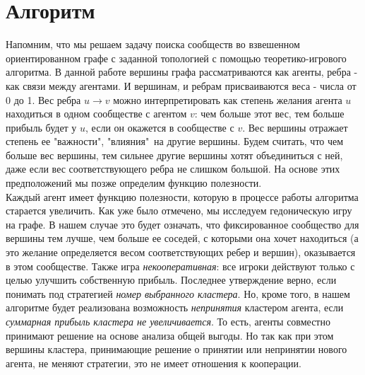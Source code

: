 \chapter{Алгоритм}
Напомним, что мы решаем задачу поиска сообществ во взвешенном ориентированном графе с заданной топологией с помощью теоретико-игрового алгоритма. В данной работе вершины графа рассматриваются как агенты, ребра - как связи между агентами. И вершинам, и ребрам присваиваются веса - числа от 0 до 1. Вес ребра $u\rightarrow v$ можно интерпретировать как степень желания агента $u$ находиться в одном сообществе с агентом $v$: чем больше этот вес, тем больше прибыль будет у $u$, если он окажется в сообществе с $v$. Вес вершины отражает степень ее "важности", "влияния"\ на другие вершины. Будем считать, что чем больше вес вершины, тем сильнее другие вершины хотят объединиться с ней, даже если вес соответствующего ребра не слишком большой. На основе этих предположений мы позже определим функцию полезности.\\

Каждый агент имеет функцию полезности, которую в процессе работы алгоритма старается увеличить. Как уже было отмечено, мы исследуем гедоническую игру на графе. В нашем случае это будет означать, что фиксированное сообщество для вершины тем лучше, чем больше ее соседей, с которыми она хочет находиться (а это желание определяется весом соответствующих ребер и вершин), оказывается в этом сообществе. Также игра \textit{некооперативная}: все игроки действуют только с целью улучшить собственную прибыль. Последнее утверждение верно, если понимать под стратегией \textit{номер выбранного кластера}. Но, кроме того, в нашем алгоритме будет реализована возможность \textit{непринятия} кластером агента, если \textit{суммарная прибыль кластера не увеличивается}. То есть, агенты совместно принимают решение на основе анализа общей выгоды. Но так как при этом вершины кластера, принимающие решение о принятии или непринятии нового агента, не меняют стратегии, это не имеет отношения к кооперации.\\

